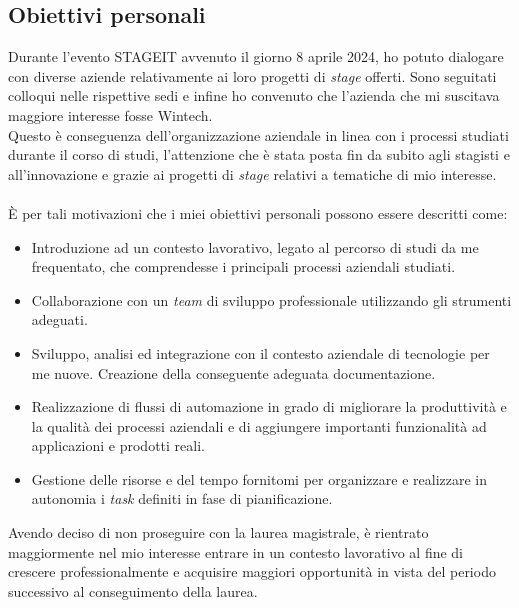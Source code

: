 \subsection{Obiettivi personali}
Durante l'evento STAGEIT avvenuto il giorno 8 aprile 2024, ho potuto dialogare con diverse aziende relativamente ai loro progetti di \emph{stage} offerti. Sono seguitati colloqui nelle rispettive sedi e infine ho convenuto che l'azienda che mi suscitava maggiore interesse fosse Wintech.\\
Questo è conseguenza dell'organizzazione aziendale in linea con i processi studiati durante il corso di studi, l'attenzione che è stata posta fin da subito agli stagisti e all'innovazione e grazie ai progetti di \emph{stage} relativi a tematiche di mio interesse.\\\\
È per tali motivazioni che i miei obiettivi personali possono essere descritti come:
\begin{itemize}
    \item Introduzione ad un contesto lavorativo, legato al percorso di studi da me frequentato, che comprendesse i principali processi aziendali studiati. 
    \item Collaborazione con un \emph{team} di sviluppo professionale utilizzando gli strumenti adeguati. 
    \item Sviluppo, analisi ed integrazione con il contesto aziendale di tecnologie per me nuove. Creazione della conseguente adeguata documentazione. 
    \item Realizzazione di flussi di automazione in grado di migliorare la produttività e la qualità dei processi aziendali e di aggiungere importanti funzionalità ad applicazioni e prodotti reali. 
    \item Gestione delle risorse e del tempo fornitomi per organizzare e realizzare in autonomia i \emph{task} definiti in fase di pianificazione.\\
\end{itemize}
Avendo deciso di non proseguire con la laurea magistrale, è rientrato maggiormente nel mio interesse entrare in un contesto lavorativo al fine di crescere professionalmente e acquisire maggiori opportunità in vista del periodo successivo al conseguimento della laurea. 

 

